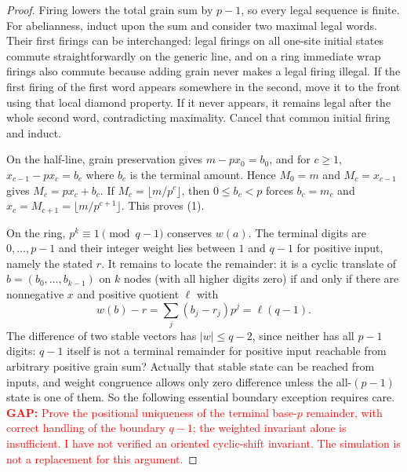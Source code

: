 \documentclass[10pt]{article}
\theoremstyle{definition}\newtheorem*{definition}{Definition}
\theoremstyle{remark}\newtheorem*{remark}{Remark}
\newcommand{\GAP}[1]{\textcolor{red}{\textbf{GAP: }#1}}
\begin{document}
\begin{proof} Firing lowers the total grain sum by $p-1$, so every legal
sequence is finite. For abelianness, induct upon the sum and consider two
maximal legal words. Their first firings can be interchanged: legal firings
on all one-site initial states commute straightforwardly on the generic line,
and on a ring immediate wrap firings also commute because adding grain never
makes a legal firing illegal. If the first firing of the first word appears
somewhere in the second, move it to the front using that local diamond
property. If it never appears, it remains legal after the whole second word,
contradicting maximality. Cancel that common initial firing and induct.

On the half-line, grain preservation gives $m-p x_0=b_0$, and for $c\ge1$,
$x_{c-1}-p x_c=b_c$ where $b_c$ is the terminal amount. Hence
$M_0=m$ and $M_c=x_{c-1}$ gives $M_c=p x_c+b_c$. If
$M_c=\lfloor m/p^c\rfloor$, then $0\le b_c<p$ forces $b_c=m_c$ and
$x_c=M_{c+1}=\lfloor m/p^{c+1}\rfloor$. This proves (1).

On the ring, $p^k\equiv1\pmod{q-1}$ conserves $w(a)$. The terminal digits
are $0,\ldots,p-1$ and their integer weight lies between $1$ and $q-1$ for
positive input, namely the stated $r$. It remains to locate the remainder:
it is a cyclic translate of $b=(b_0,\ldots,b_{k-1})$ on $k$ nodes (with all
higher digits zero) if and only if there are nonnegative $x$ and positive
quotient $\ell$ with
\[
 w(b)-r=\sum_j(b_j-r_j)p^j=\ell(q-1).
\]
The difference of two stable vectors has $|w|\le q-2$, since neither has
all $p-1$ digits: $q-1$ itself is not a terminal remainder for positive
input reachable from arbitrary positive grain sum? Actually that stable state
can be reached from inputs, and weight congruence allows only zero difference
unless the all-$(p-1)$ state is one of them. So the following essential
boundary exception requires care. \GAP{Prove the positional uniqueness of
the terminal base-$p$ remainder, with correct handling of the boundary
$q-1$; the weighted invariant alone is insufficient. I have not verified an
oriented cyclic-shift invariant. The simulation is not a replacement for
this argument.}


\end{proof}
\end{document}
